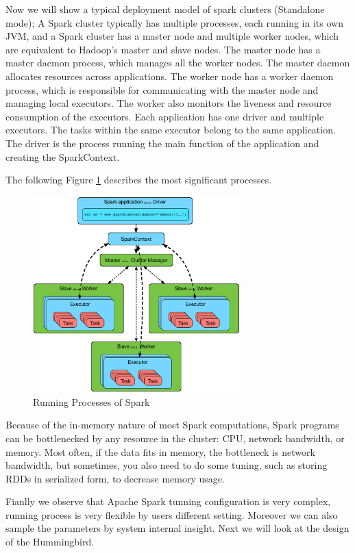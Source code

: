 \par Now we will show a typical deployment model of spark clusters (Standalone mode); A Spark cluster typically has multiple processes, each running in its own JVM, and a Spark cluster has a master node and multiple worker nodes, which are equivalent to Hadoop's master and slave nodes. The master node has a master daemon process, which manages all the worker nodes. The master daemon allocates resources across applications. The worker node has a worker daemon process, which is responsible for communicating with the master node and managing local executors. The worker also monitors the liveness and resource consumption of the executors. Each application has one driver and multiple executors. The tasks within the same executor belong to the same application. The driver is the process running the main function of the application and creating the SparkContext.
\par The following Figure \ref{fig:RunningSpark} describes the most significant processes.
\begin{figure}
	\includegraphics[width=8cm]{4.eps}
	\caption{Running Processes of Spark}\label{fig:RunningSpark}
\end{figure}

\par Because of the in-memory nature of most Spark computations, Spark programs can be bottlenecked by any resource in the cluster: CPU, network bandwidth, or memory. Most often, if the data fits in memory, the bottleneck is network bandwidth, but sometimes, you also need to do some tuning, such as storing RDDs in serialized form, to decrease memory usage. 

\par Fianlly we observe that Apache Spark tunning configuration is very complex, running process is very flexible by users different setting. Moreover we can also sample the parameters by system internal insight. Next we will look at the design of the Hummingbird.

